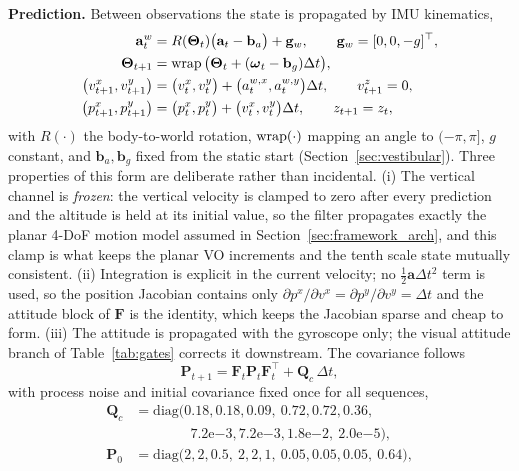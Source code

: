 \textbf{Prediction.} Between observations the state is propagated by IMU kinematics,
\begin{equation}
\begin{aligned}
    \mathbf{a}^{w}_t &= R(\boldsymbol{\Theta}_t)\big(\mathbf{a}_t-\mathbf{b}_a\big)+\mathbf{g}_w,\qquad \mathbf{g}_w=[0,0,-g]^{\top},\\
    \boldsymbol{\Theta}_{t+1} &= \operatorname{wrap}\big(\boldsymbol{\Theta}_t+(\boldsymbol{\omega}_t-\mathbf{b}_g)\Delta t\big),\\
    \big(v^{x}_{t+1},v^{y}_{t+1}\big) &= \big(v^{x}_t,v^{y}_t\big)+\big(a^{w,x}_t,a^{w,y}_t\big)\Delta t,\qquad v^{z}_{t+1}=0,\\
    \big(p^{x}_{t+1},p^{y}_{t+1}\big) &= \big(p^{x}_t,p^{y}_t\big)+\big(v^{x}_t,v^{y}_t\big)\Delta t,\qquad z_{t+1}=z_t,
\end{aligned}
    \label{eq:ekf_pred}
\end{equation}
with $R(\cdot)$ the body-to-world rotation, $\operatorname{wrap}(\cdot)$ mapping an angle to $(-\pi,\pi]$, $g$ constant, and $\mathbf{b}_a,\mathbf{b}_g$ fixed from the static start (Section~\ref{sec:vestibular}). Three properties of this form are deliberate rather than incidental. (i) The vertical channel is \emph{frozen}: the vertical velocity is clamped to zero after every prediction and the altitude is held at its initial value, so the filter propagates exactly the planar 4-DoF motion model assumed in Section~\ref{sec:framework_arch}, and this clamp is what keeps the planar VO increments and the tenth scale state mutually consistent. (ii) Integration is explicit in the current velocity; no $\tfrac12\mathbf{a}\Delta t^{2}$ term is used, so the position Jacobian contains only $\partial p^{x}/\partial v^{x}=\partial p^{y}/\partial v^{y}=\Delta t$ and the attitude block of $\mathbf{F}$ is the identity, which keeps the Jacobian sparse and cheap to form. (iii) The attitude is propagated with the gyroscope only; the visual attitude branch of Table~\ref{tab:gates} corrects it downstream. The covariance follows
\begin{equation}
    \mathbf{P}_{t+1}=\mathbf{F}_t\mathbf{P}_t\mathbf{F}_t^{\top}+\mathbf{Q}_c\,\Delta t,
    \label{eq:ekf_cov}
\end{equation}
with process noise and initial covariance fixed once for all sequences,
\begin{equation}
\begin{aligned}
    \mathbf{Q}_c&=\mathrm{diag}\big(0.18,0.18,0.09,\ 0.72,0.72,0.36,\\
    &\qquad\qquad 7.2\mathrm{e}{-3},7.2\mathrm{e}{-3},1.8\mathrm{e}{-2},\ 2.0\mathrm{e}{-5}\big),\\
    \mathbf{P}_0&=\mathrm{diag}\big(2,2,0.5,\ 2,2,1,\ 0.05,0.05,0.05,\ 0.64\big),
\end{aligned}
\end{equation}
